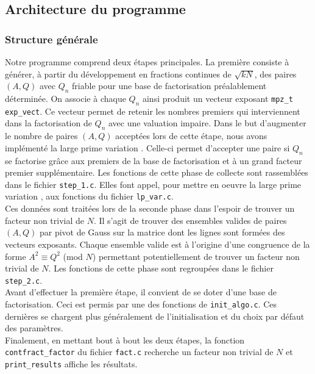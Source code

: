 \subsection{Architecture du programme}

\subsubsection{Structure générale}

Notre programme comprend deux étapes principales. La première consiste à générer, 
à partir du développement en fractions continues de $ \sqrt{kN} $, des paires 
$(A, Q)$ avec $Q_n$ friable pour une base de factorisation préalablement déterminée.
On associe à chaque $Q_n$ ainsi produit un vecteur exposant \texttt{mpz\_t exp\_vect}.
Ce vecteur permet de retenir les nombres premiers qui interviennent dans la 
factorisation de $Q_n$ avec une valuation impaire. Dans le but d'augmenter le nombre
de paires $(A,Q) $ acceptées lors de cette étape, nous avons implémenté la \og 
large prime variation \fg{}. Celle-ci permet d'accepter une paire si $Q_n$ se
factorise  grâce aux premiers de la base de factorisation et à un grand facteur
premier supplémentaire. Les fonctions de cette phase de collecte sont rassemblées
dans le fichier \texttt{step\_1.c}. Elles font appel, pour mettre en oeuvre la 
\og large prime variation \fg{}, aux fonctions du fichier \texttt{lp\_var.c}. \\
 
Ces données sont traitées lors de la seconde phase dans l'espoir de trouver un 
facteur non trivial de $N$. Il s'agit de trouver des ensembles valides de paires
$(A, Q)$ par pivot de Gauss sur la matrice dont les lignes sont formées des 
vecteurs exposants. Chaque ensemble valide est à l'origine d'une congruence de 
la forme $A^2 \equiv Q^2$ (mod $N$) permettant potentiellement de trouver un
facteur non trivial de $N$. Les fonctions de cette phase sont regroupées dans 
le fichier \texttt{step\_2.c}. \\

Avant d'effectuer la première étape, il convient de se doter d'une base de 
factorisation. Ceci est permis par une des fonctions de \texttt{init\_algo.c}.
Ces dernières se chargent plus généralement de l'initialisation et du choix par
défaut des paramètres. \\

Finalement, en mettant bout à bout les deux étapes, la fonction 
\texttt{contfract\_factor} du fichier \texttt{fact.c} recherche un facteur
non trivial de $N$ et \texttt{print\_results} affiche les résultats. 

